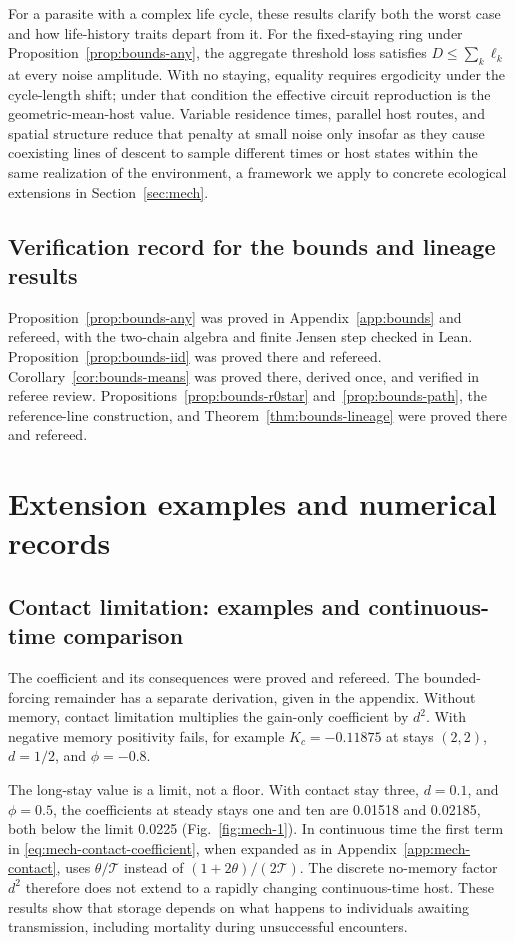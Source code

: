 For a parasite with a complex life cycle, these results clarify both the worst case and how life-history traits depart from it. For the fixed-staying ring under Proposition~\ref{prop:bounds-any}, the aggregate threshold loss satisfies $D\leq\sum_k\ell_k$ at every noise amplitude. With no staying, equality requires ergodicity under the cycle-length shift; under that condition the effective circuit reproduction is the geometric-mean-host value. Variable residence times, parallel host routes, and spatial structure reduce that penalty at small noise only insofar as they cause coexisting lines of descent to sample different times or host states within the same realization of the environment, a framework we apply to concrete ecological extensions in Section~\ref{sec:mech}.

\subsection{Verification record for the bounds and lineage results}\label{esm:bounds-verification}

Proposition~\ref{prop:bounds-any} was proved in Appendix~\ref{app:bounds} and refereed, with the two-chain algebra and finite Jensen step checked in Lean. Proposition~\ref{prop:bounds-iid} was proved there and refereed. Corollary~\ref{cor:bounds-means} was proved there, derived once, and verified in referee review. Propositions~\ref{prop:bounds-r0star} and~\ref{prop:bounds-path}, the reference-line construction, and Theorem~\ref{thm:bounds-lineage} were proved there and refereed.

\section{Extension examples and numerical records}\label{esm:trim-mechanisms-dynamics}

\subsection{Contact limitation: examples and continuous-time comparison}\label{esm:trim-contact}
The coefficient and its consequences were proved and refereed. The bounded-forcing remainder has a separate derivation, given in the appendix. Without memory, contact limitation multiplies the gain-only coefficient by \(d^2\). With negative memory positivity fails, for example \(K_c=-0.11875\) at stays \((2,2)\), \(d=1/2\), and \(\phi=-0.8\).

The long-stay value is a limit, not a floor. With contact stay three, \(d=0.1\), and \(\phi=0.5\), the coefficients at steady stays one and ten are 0.01518 and 0.02185, both below the limit 0.0225 (Fig.~\ref{fig:mech-1}). In continuous time the first term in \eqref{eq:mech-contact-coefficient}, when expanded as in Appendix~\ref{app:mech-contact}, uses \(\theta/\mathcal T\) instead of \((1+2\theta)/(2\mathcal T)\). The discrete no-memory factor \(d^2\) therefore does not extend to a rapidly changing continuous-time host. These results show that storage depends on what happens to individuals awaiting transmission, including mortality during unsuccessful encounters.

